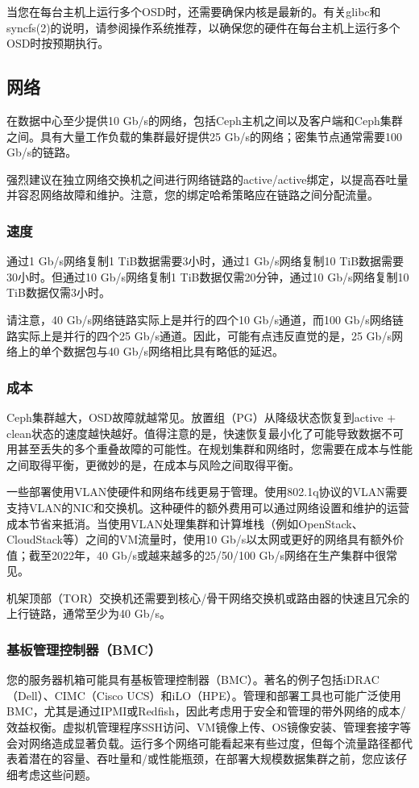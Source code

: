 \documentclass[12pt,UTF8]{ctexbook}
\begin{document}
当您在每台主机上运行多个OSD时，还需要确保内核是最新的。有关glibc和syncfs(2)的说明，请参阅操作系统推荐，以确保您的硬件在每台主机上运行多个OSD时按预期执行。

\subsection{网络}
在数据中心至少提供10 Gb/s的网络，包括Ceph主机之间以及客户端和Ceph集群之间。具有大量工作负载的集群最好提供25 Gb/s的网络；密集节点通常需要100 Gb/s的链路。

强烈建议在独立网络交换机之间进行网络链路的active/active绑定，以提高吞吐量并容忍网络故障和维护。注意，您的绑定哈希策略应在链路之间分配流量。

\subsubsection{速度}
通过1 Gb/s网络复制1 TiB数据需要3小时，通过1 Gb/s网络复制10 TiB数据需要30小时。但通过10 Gb/s网络复制1 TiB数据仅需20分钟，通过10 Gb/s网络复制10 TiB数据仅需3小时。

请注意，40 Gb/s网络链路实际上是并行的四个10 Gb/s通道，而100 Gb/s网络链路实际上是并行的四个25 Gb/s通道。因此，可能有点违反直觉的是，25 Gb/s网络上的单个数据包与40 Gb/s网络相比具有略低的延迟。

\subsubsection{成本}
Ceph集群越大，OSD故障就越常见。放置组（PG）从降级状态恢复到active + clean状态的速度越快越好。值得注意的是，快速恢复最小化了可能导致数据不可用甚至丢失的多个重叠故障的可能性。在规划集群和网络时，您需要在成本与性能之间取得平衡，更微妙的是，在成本与风险之间取得平衡。

一些部署使用VLAN使硬件和网络布线更易于管理。使用802.1q协议的VLAN需要支持VLAN的NIC和交换机。这种硬件的额外费用可以通过网络设置和维护的运营成本节省来抵消。当使用VLAN处理集群和计算堆栈（例如OpenStack、CloudStack等）之间的VM流量时，使用10 Gb/s以太网或更好的网络具有额外价值；截至2022年，40 Gb/s或越来越多的25/50/100 Gb/s网络在生产集群中很常见。

机架顶部（TOR）交换机还需要到核心/骨干网络交换机或路由器的快速且冗余的上行链路，通常至少为40 Gb/s。

\subsubsection{基板管理控制器（BMC）}
您的服务器机箱可能具有基板管理控制器（BMC）。著名的例子包括iDRAC（Dell）、CIMC（Cisco UCS）和iLO（HPE）。管理和部署工具也可能广泛使用BMC，尤其是通过IPMI或Redfish，因此考虑用于安全和管理的带外网络的成本/效益权衡。虚拟机管理程序SSH访问、VM镜像上传、OS镜像安装、管理套接字等会对网络造成显著负载。运行多个网络可能看起来有些过度，但每个流量路径都代表着潜在的容量、吞吐量和/或性能瓶颈，在部署大规模数据集群之前，您应该仔细考虑这些问题。
\end{document}
